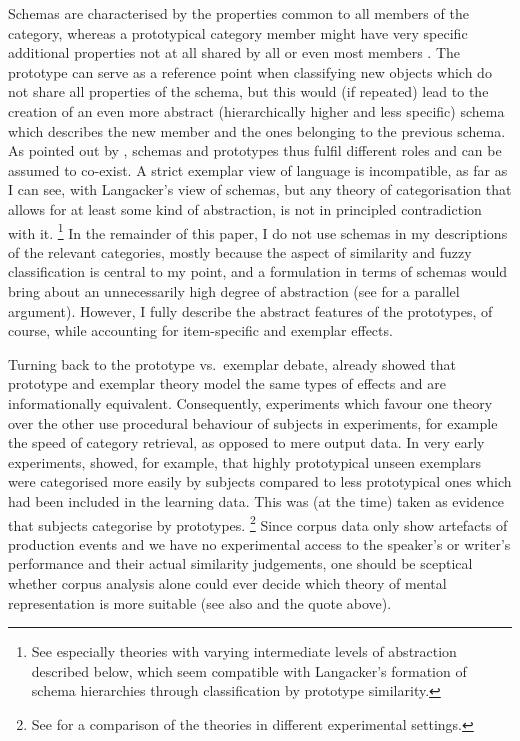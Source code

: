 Schemas are characterised by the properties common to all members of the category, whereas a prototypical category member might have very specific additional properties not at all shared by all or even most members \citep[371-375]{Langacker1987}.
The prototype can serve as a reference point when classifying new objects which do not share all properties of the schema, but this would (if repeated) lead to the creation of an even more abstract (hierarchically higher and less specific) schema which describes the new member and the ones belonging to the previous schema.
As pointed out by \citet[136--137]{Langacker1987}, schemas and prototypes thus fulfil different roles and can be assumed to co-exist.
A strict exemplar view of language is incompatible, as far as I can see, with Langacker's view of schemas, but any theory of categorisation that allows for at least some kind of abstraction, is not in principled contradiction with it.%
\footnote{See especially theories with varying intermediate levels of abstraction described below, which seem compatible with Langacker's formation of schema hierarchies through classification by prototype similarity.}
In the remainder of this paper, I do not use schemas in my descriptions of the relevant categories, mostly because the aspect of similarity and fuzzy classification is central to my point, and a formulation in terms of schemas would bring about an unnecessarily high degree of abstraction (see \citealp[70--71]{Taylor2003} for a parallel argument).
However, I fully describe the abstract features of the prototypes, of course, while accounting for item-specific and exemplar effects.

Turning back to the prototype vs.\ exemplar debate, \cite{Barsalou1990} already showed that prototype and exemplar theory model the same types of effects and are informationally equivalent.
Consequently, experiments which favour one theory over the other use procedural behaviour of subjects in experiments, for example the speed of category retrieval, as opposed to mere output data.
In very early experiments, \cite{PosnerKeele1968} showed, for example, that highly prototypical unseen exemplars were categorised more easily by subjects compared to less prototypical ones which had been included in the learning data.
This was (at the time) taken as evidence that subjects categorise by prototypes.%
\footnote{See \citet{StormsEa2000} for a comparison of the theories in different experimental settings.}
Since corpus data only show artefacts of production events and we have no experimental access to the speaker's or writer's performance and their actual similarity judgements, one should be sceptical whether corpus analysis alone could ever decide which theory of mental representation is more suitable (see also \citealp[22]{Gries2003} and the \citealp[486--487]{Dabrowska2016} quote above).

